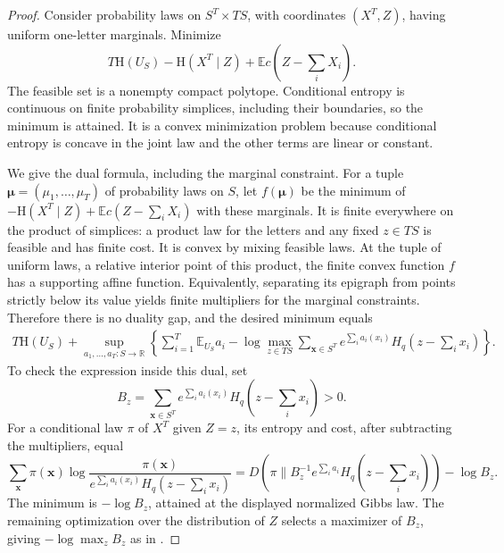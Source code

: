 \begin{proof}
Consider probability laws on $S^T\times TS$, with coordinates $(X^T,Z)$,
having uniform one-letter marginals.  Minimize
\[
 T\mathrm H(U_S)-\mathrm H(X^T\mid Z)
       +\mathbb E c\!\left(Z-\sum_iX_i\right).
\]
The feasible set is a nonempty compact polytope.  Conditional entropy is
continuous on finite probability simplices, including their boundaries, so
the minimum is attained.  It is a convex minimization problem because
conditional entropy is concave in the joint law and the other terms are
linear or constant.

We give the dual formula, including the marginal constraint.  For a tuple
$\boldsymbol\mu=(\mu_1,\ldots,\mu_T)$ of probability laws on $S$, let
$f(\boldsymbol\mu)$ be the minimum of
$-\mathrm H(X^T\mid Z)+\mathbb E c(Z-\sum_iX_i)$ with these marginals.
It is finite everywhere on the product of simplices: a product law for the
letters and any fixed $z\in TS$ is feasible and has finite cost.  It is
convex by mixing feasible laws.  At the tuple of uniform laws, a relative
interior point of this product, the finite convex function $f$ has a
supporting affine function.  Equivalently, separating its epigraph from
points strictly below its value yields finite multipliers for the marginal
constraints.  Therefore there is no duality gap, and the desired minimum
equals
\begin{equation}
\label{entropy-foundations:dual}
\begin{split}
 T\mathrm H(U_S)+\sup_{a_1,\ldots,a_T:S\to\mathbb R}
 \left\{\sum_{i=1}^T\mathbb E_{U_S}a_i
 -\log\max_{z\in TS}
   \sum_{\boldsymbol x\in S^T}
      e^{\sum_i a_i(x_i)}
      H_q\!\left(z-\sum_i x_i\right)\right\}.
\end{split}
\end{equation}
To check the expression inside this dual, set
\[
 B_z=\sum_{\boldsymbol x\in S^T}
       e^{\sum_i a_i(x_i)}H_q\!\left(z-\sum_i x_i\right)>0.
\]
For a conditional law $\pi$ of $X^T$ given $Z=z$, its entropy and cost,
after subtracting the multipliers, equal
\[
 \sum_{\boldsymbol x}\pi(\boldsymbol x)
 \log\frac{\pi(\boldsymbol x)}{
        e^{\sum_i a_i(x_i)}H_q(z-\sum_i x_i)}
 =D(\pi\|B_z^{-1}e^{\sum_i a_i}H_q(z-\textstyle\sum_i x_i))
       -\log B_z.
\]
The minimum is $-\log B_z$, attained at the displayed normalized Gibbs
law.  The remaining optimization over the distribution of $Z$ selects a
maximizer of $B_z$, giving $-\log\max_z B_z$ as in
.


\end{proof}

